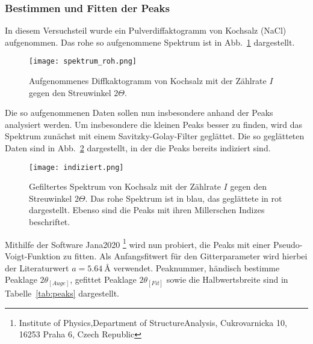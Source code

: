 \subsubsection{Bestimmen und Fitten der Peaks}
\label{sec:peaks}
In diesem Versuchsteil wurde ein Pulverdiffaktogramm von Kochsalz (NaCl) aufgenommen. Das rohe so aufgenommene Spektrum ist in Abb.~\ref{fig:rohspektrum} dargestellt.
\begin{figure}[h!]
    \centering
    \texttt{[image: spektrum\_roh.png]}
    \caption{Aufgenommenes Diffkaktogramm von Kochsalz mit der Zählrate $I$ gegen den Streuwinkel $2\Theta$.}
    \label{fig:rohspektrum}
\end{figure}

Die so aufgenommenen Daten sollen nun insbesondere anhand der Peaks analysiert werden. 
Um insbesondere die kleinen Peaks besser zu finden, wird das Spektrum zunächst mit einem Savitzky-Golay-Filter geglättet. Die so geglätteten Daten sind in Abb.~\ref{fig:geglättet} dargestellt, in der die Peaks bereits indiziert sind.
\begin{figure}
    \centering
    \texttt{[image: indiziert.png]}
    \caption{Gefiltertes Spektrum von Kochsalz mit der Zählrate $I$ gegen den Streuwinkel $2\Theta$. Das rohe Spektrum ist in blau, das geglättete in rot dargestellt. Ebenso sind die Peaks mit ihren Millerschen Indizes beschriftet.}
    \label{fig:geglättet}
\end{figure}
Mithilfe der Software Jana2020 \footnote[1]{Institute of Physics,Department of StructureAnalysis, Cukrovarnicka 10, 16253 Praha 6, Czech Republic} wird nun probiert, die Peaks mit einer Pseudo-Voigt-Funktion zu fitten. Als Anfangsfitwert für den Gitterparameter wird hierbei der Literaturwert $a = \SI{5,64}[]{\angstrom}$ verwendet. Peaknummer, händisch bestimme Peaklage $2\theta_{[Auge]}$, gefittet Peaklage $2\theta_{[Fit]}$ sowie die Halbwertsbreite sind in Tabelle~\ref{tab:peaks} dargestellt.


